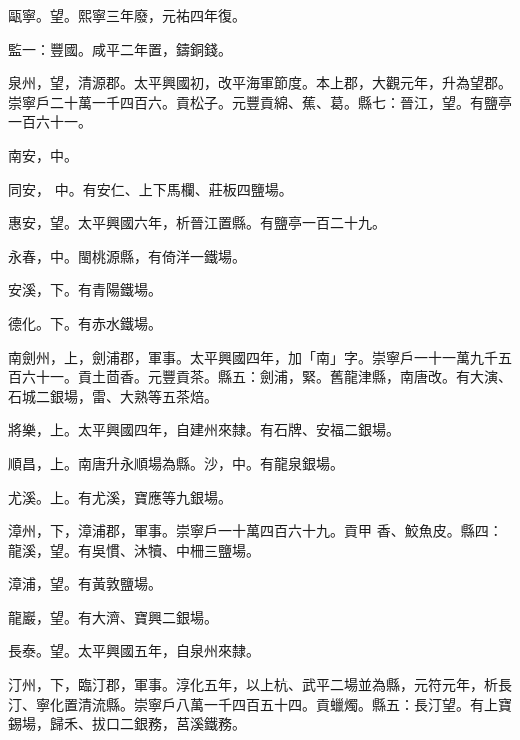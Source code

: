 \begin{pinyinscope}
 甌寧。望。熙寧三年廢，元祐四年復。



 監一：豐國。咸平二年置，鑄銅錢。



 泉州，望，清源郡。太平興國初，改平海軍節度。本上郡，大觀元年，升為望郡。崇寧戶二十萬一千四百六。貢松子。元豐貢綿、蕉、葛。縣七：晉江，望。有鹽亭一百六十一。



 南安，中。



 同安，
 中。有安仁、上下馬欄、莊板四鹽場。



 惠安，望。太平興國六年，析晉江置縣。有鹽亭一百二十九。



 永春，中。閩桃源縣，有倚洋一鐵場。



 安溪，下。有青陽鐵場。



 德化。下。有赤水鐵場。



 南劍州，上，劍浦郡，軍事。太平興國四年，加「南」字。崇寧戶一十一萬九千五百六十一。貢土茴香。元豐貢茶。縣五：劍浦，緊。舊龍津縣，南唐改。有大演、石城二銀場，雷、大熟等五茶焙。



 將樂，上。太平興國四年，自建州來隸。有石牌、安福二銀場。



 順昌，上。南唐升永順場為縣。沙，中。有龍泉銀場。



 尤溪。上。有尤溪，寶應等九銀場。



 漳州，下，漳浦郡，軍事。崇寧戶一十萬四百六十九。貢甲
 香、鮫魚皮。縣四：龍溪，望。有吳慣、沐犢、中柵三鹽場。



 漳浦，望。有黃敦鹽場。



 龍巖，望。有大濟、寶興二銀場。



 長泰。望。太平興國五年，自泉州來隸。



 汀州，下，臨汀郡，軍事。淳化五年，以上杭、武平二場並為縣，元符元年，析長汀、寧化置清流縣。崇寧戶八萬一千四百五十四。貢蠟燭。縣五：長汀望。有上寶錫場，歸禾、拔口二銀務，莒溪鐵務。




\end{pinyinscope}
